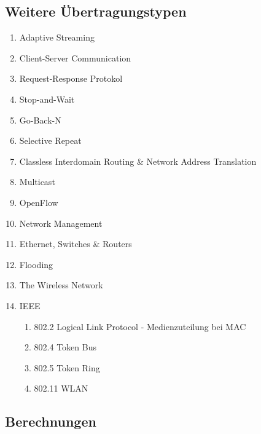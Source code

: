 \documentclass{article}
\begin{document}
    \subsection{ Weitere Übertragungstypen }
    \begin{enumerate}
        \item Adaptive Streaming 
        \item Client-Server Communication
        \item Request-Response Protokol
        \item Stop-and-Wait
        \item Go-Back-N
        \item Selective Repeat
        \item Classless Interdomain Routing \& Network Address Translation %
        \item Multicast 
        \item OpenFlow
        \item Network Management
        \item Ethernet, Switches \& Routers
        \item Flooding %
        \item The Wireless Network
        \item IEEE
        \begin{enumerate}
            \item 802.2 Logical Link Protocol - Medienzuteilung bei MAC
            \item 802.4 Token Bus
            \item 802.5 Token Ring
            \item 802.11 WLAN
        \end{enumerate}
    \end{enumerate}
    
    \subsection{Berechnungen}
\end{document}
